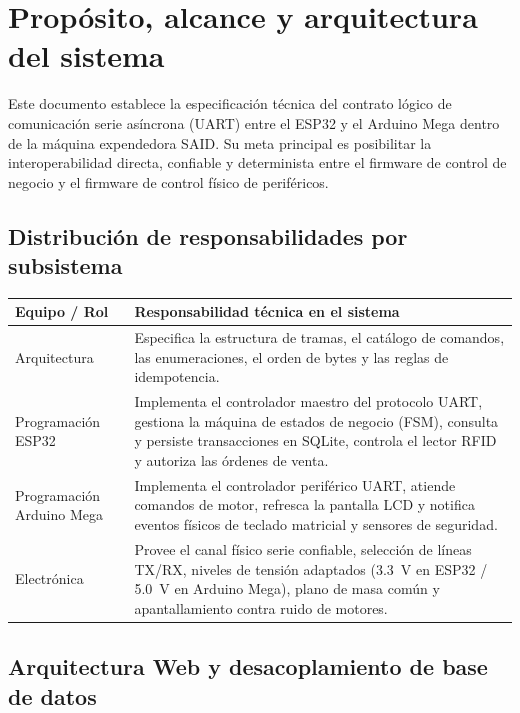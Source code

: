 \documentclass[a4paper,11pt]{article}
\newcommand{\tablehead}[1]{\cellcolor{SAIDBlue}\color{white}\textbf{#1}}
\begin{document}

\section{Propósito, alcance y arquitectura del sistema}

Este documento establece la especificación técnica del contrato lógico de
comunicación serie asíncrona (UART) entre el ESP32 y el Arduino Mega dentro de la
máquina expendedora SAID. Su meta principal es posibilitar la interoperabilidad
directa, confiable y determinista entre el firmware de control de negocio y el
firmware de control físico de periféricos.

\subsection{Distribución de responsabilidades por subsistema}

\noindent\begin{tabularx}{\textwidth}{|p{3.5cm}|X|}
    \hline
    \tablehead{Equipo / Rol} & \tablehead{Responsabilidad técnica en el sistema} \\
    \hline
    Arquitectura & Especifica la estructura de tramas, el catálogo de comandos, las enumeraciones, el orden de bytes y las reglas de idempotencia. \\
    \hline
    Programación ESP32 & Implementa el controlador maestro del protocolo UART, gestiona la máquina de estados de negocio (FSM), consulta y persiste transacciones en SQLite, controla el lector RFID y autoriza las órdenes de venta. \\
    \hline
    Programación Arduino Mega & Implementa el controlador periférico UART, atiende comandos de motor, refresca la pantalla LCD y notifica eventos físicos de teclado matricial y sensores de seguridad. \\
    \hline
    Electrónica & Provee el canal físico serie confiable, selección de líneas TX/RX, niveles de tensión adaptados (3.3~V en ESP32 / 5.0~V en Arduino Mega), plano de masa común y apantallamiento contra ruido de motores. \\
    \hline
\end{tabularx}

\subsection{Arquitectura Web y desacoplamiento de base de datos}
\end{document}
